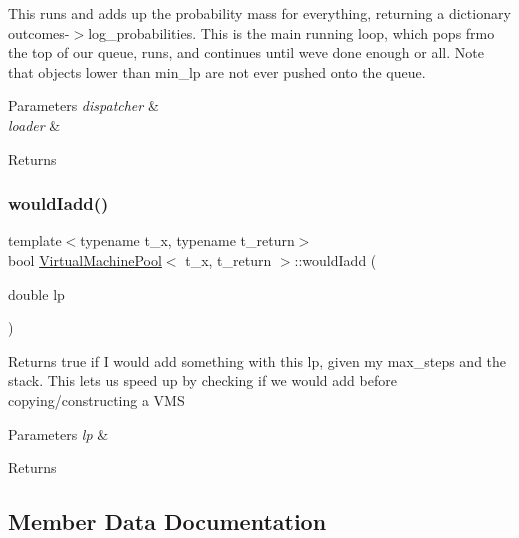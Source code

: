 This runs and adds up the probability mass for everything, returning a dictionary outcomes-\/$>$log\+\_\+probabilities. This is the main running loop, which pops frmo the top of our queue, runs, and continues until we\textquotesingle{}ve done enough or all. Note that objects lower than min\+\_\+lp are not ever pushed onto the queue. 
\begin{DoxyParams}{Parameters}
{\em dispatcher} & \\
\hline
{\em loader} & \\
\hline
\end{DoxyParams}
\begin{DoxyReturn}{Returns}

\end{DoxyReturn}
\mbox{\label{class_virtual_machine_pool_a4313a26d5523b4ad07927c9de2344c2e}} 
\subsubsection{\texorpdfstring{would\+Iadd()}{wouldIadd()}}
{\footnotesize\ttfamily template$<$typename t\+\_\+x, typename t\+\_\+return$>$ \\
bool \hyperlink{class_virtual_machine_pool}{Virtual\+Machine\+Pool}$<$ t\+\_\+x, t\+\_\+return $>$\+::would\+Iadd (\begin{DoxyParamCaption}\item[{double}]{lp }\end{DoxyParamCaption})\hspace{0.3cm}{\ttfamily [inline]}}

Returns true if I would add something with this lp, given my max\+\_\+steps and the stack. This lets us speed up by checking if we would add before copying/constructing a V\+MS 
\begin{DoxyParams}{Parameters}
{\em lp} & \\
\hline
\end{DoxyParams}
\begin{DoxyReturn}{Returns}

\end{DoxyReturn}


\subsection{Member Data Documentation}
\mbox{\label{class_virtual_machine_pool_a31cd55d7c9c7daf930bcc7f57b67d930}} 
